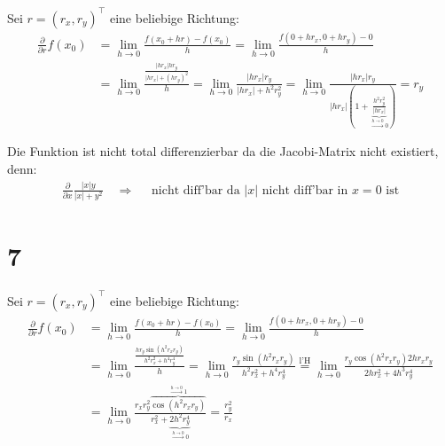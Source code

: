 \documentclass[11pt,a4paper]{article}
\newcommand{\1}    	{\mathbbm{1}}
\begin{document}
	\noindent
	Sei \(r = (r_x, r_y)^\top\) eine beliebige Richtung:
	\begin{align*}
		\frac{\partial}{\partial r} f(x_0) &= 
		\lim_{h \rightarrow 0} \frac{f(x_0 + h r) - f(x_0)}{h} =
		\lim_{h \rightarrow 0} \frac{f(0 + h r_x, 0 + h r_y) - 0}{h} \\
		&= \lim_{h \rightarrow 0} \frac{\frac{\vert h r_x \vert h r_y}{\vert h r_x \vert + \left( h r_y \right)^2}}{h} =
		\lim_{h \rightarrow 0} \frac{\vert h r_x \vert  r_y}{\vert h r_x \vert + h^2 r_y^2} =
		\lim_{h \rightarrow 0} \frac{\vert h r_x \vert r_y}{\vert h r_x \vert ( 1 + \underbrace{\frac{h^2 r_y^2}{\vert h r_x \vert}}_{\stackrel{h \rightarrow 0}{\rightarrow} 0})} = r_y
	\end{align*}
	
	\noindent
	Die Funktion ist nicht total differenzierbar da die Jacobi-Matrix nicht existiert, denn:
	\begin{align*}
		\frac{\partial}{\partial x} \frac{\vert x \vert y}{\vert x \vert + y^2} \quad \Rightarrow \quad \textrm{ nicht diff'bar da } \vert x \vert \textrm{ nicht diff'bar in } x = 0 \textrm{ ist}
	\end{align*}
	
	\section*{7}	
	Sei \(r = (r_x, r_y)^\top\) eine beliebige Richtung:
	\begin{align*}
		\frac{\partial}{\partial r} f(x_0) &= 
		\lim_{h \rightarrow 0} \frac{f(x_0 + h r) - f(x_0)}{h} =
		\lim_{h \rightarrow 0} \frac{f(0 + h r_x, 0 + h r_y) - 0}{h} \\
		&= \lim_{h \rightarrow 0} \frac{\frac{h r_y \sin(h^2 r_x r_y)}{h^2 r_x^2 + h^4 r_y^4}}{h} = 
		\lim_{h \rightarrow 0} \frac{r_y \sin(h^2 r_x r_y)}{h^2 r_x^2 + h^4 r_y^4} \stackrel{\textrm{l'H}}{=} 
			\lim_{h \rightarrow 0} \frac{r_y \cos( h^2 r_x r_y) 2h r_x r_y}{2 h r_x^2 + 4h^3 r_y^4} \\
			&= \lim_{h \rightarrow 0} \frac{r_x r_y^2 \overbrace{\cos( h^2 r_x r_y)}^{\stackrel{h \rightarrow 0}{\rightarrow}1}}{r_x^2 + \underbrace{2h^2 r_y^4}_{\stackrel{h \rightarrow 0}{\rightarrow}0}} = \frac{r_y^2}{r_x}
	\end{align*}
	
\end{document}
